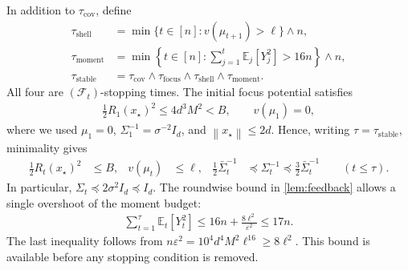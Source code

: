 \documentclass{article}
\newcommand{\E}{\mathbb E}
\newcommand{\F}{\mathcal F}
\newcommand{\1}{\mathbf 1}
\newcommand{\eps}{\varepsilon}
\newcommand{\norm}[1]{\left\lVert #1\right\rVert}
\begin{document}
In addition to $\tau_{\mathrm{cov}}$, define
\begin{align}
    \tau_{\mathrm{shell}}
     & =\min\{t\in[n]:v(\mu_{t+1})>\ell\}\wedge n,
    \\
    \tau_{\mathrm{moment}}
     & =\min\left\{t\in[n]:\sum_{j=1}^t\E_j[Y_j^2]>16n\right\}\wedge n,
    \\
    \tau_{\mathrm{stable}}
     & =\tau_{\mathrm{cov}}\wedge\tau_{\mathrm{focus}}
    \wedge\tau_{\mathrm{shell}}\wedge\tau_{\mathrm{moment}}.
    \label{eq:safe-stopping-time}
\end{align}
All four are $(\F_t)$-stopping times. The initial focus potential satisfies
\begin{align}
    \frac12R_1(x_\star)^2
    \leq4d^3M^2<B,
    \qquad v(\mu_1)=0,
    \label{eq:initial-focus}
\end{align}
where we used $\mu_1=0$, $\Sigma_1^{-1}=\sigma^{-2}I_d$, and
$\norm{x_\star}\leq2d$. Hence, writing $\tau=\tau_{\mathrm{stable}}$,
minimality gives
\begin{align}
    \frac12R_t(x_\star)^2 & \leq B,
                          & v(\mu_t)                                              & \leq \ell,
                          & \frac12\bar{\Sigma}_t^{-1}
                          & \preceq\Sigma_t^{-1}\preceq\frac32\bar{\Sigma}_t^{-1}
    \qquad(t\leq\tau).
    \label{eq:stability-stopped-invariants}
\end{align}
In particular, $\Sigma_t\preceq2\sigma^2I_d\preceq I_d$.
The roundwise bound in \cref{lem:feedback} allows a single overshoot of
the moment budget:
\begin{align}
    \sum_{t=1}^\tau\E_t[Y_t^2]
    \leq16n+\frac{8\ell^2}{\eps^2}
    \leq17n.
    \label{eq:stopped-moment-budget}
\end{align}
The last inequality follows from
$n\eps^2=10^4d^4M^2\ell^{16}\geq8\ell^2$.
This bound is available before any stopping condition is removed.
\end{document}
